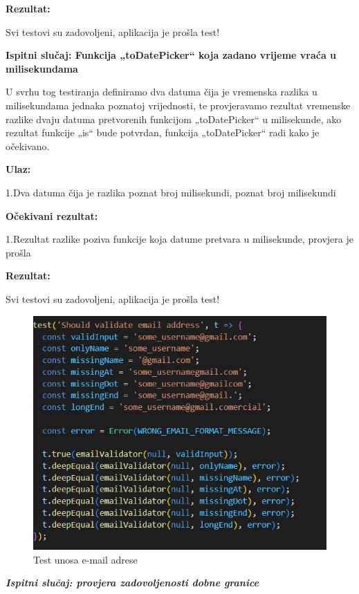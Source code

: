  \textbf{Rezultat:}  

Svi testovi su zadovoljeni, aplikacija je prošla test!



\textbf{Ispitni slučaj: Funkcija „toDatePicker“ koja zadano vrijeme vraća u milisekundama}

U svrhu tog testiranja definiramo dva datuma čija je vremenska razlika u milisekundama jednaka poznatoj vrijednosti, te provjeravamo rezultat vremenske razlike dvaju datuma pretvorenih funkcijom „toDatePicker“ u milisekunde, ako rezultat funkcije „is“ bude potvrdan, funkcija „toDatePicker“ radi kako je očekivano.

\textbf{Ulaz:}

1.Dva datuma čija je razlika poznat broj milisekundi, poznat broj milisekundi

 \textbf{Očekivani rezultat:}  

1.Rezultat razlike poziva funkcije koja datume pretvara u milisekunde, provjera je prošla

\textbf{Rezultat:} 

 Svi testovi su zadovoljeni, aplikacija je prošla test!

\begin{figure}[H]
			\includegraphics[scale=0.5]{slike/EmailTest.PNG} %
			\centering
			\caption{Test unosa e-mail adrese}
			\label{fig:ppp}
			
		\end{figure}


 \textbf{\textit{Ispitni slučaj: provjera zadovoljenosti dobne granice}}\\

